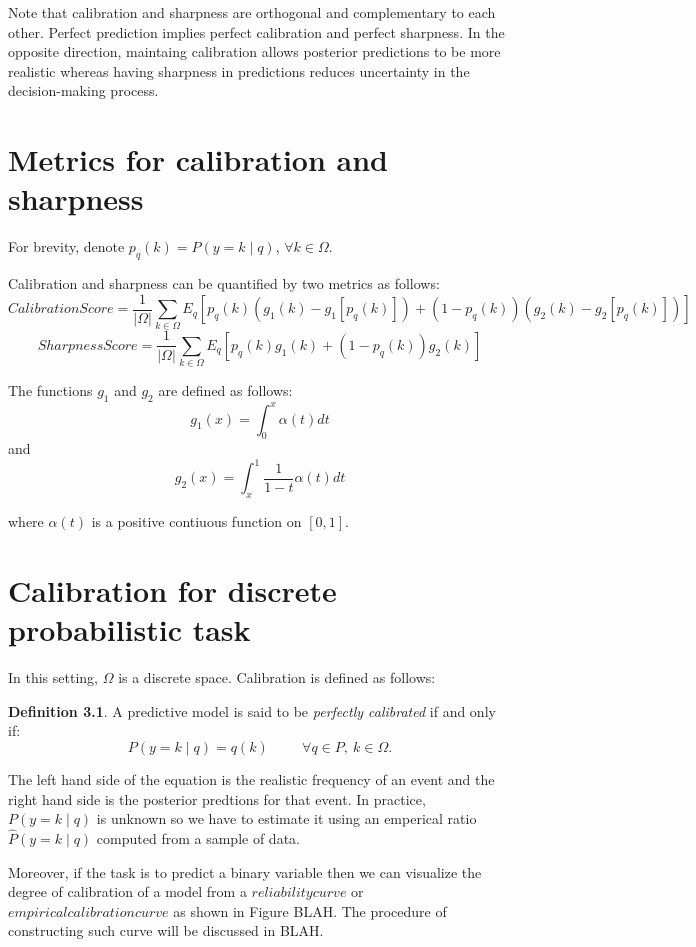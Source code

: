 Note that calibration and sharpness are orthogonal and complementary to each other. Perfect prediction implies perfect calibration and perfect sharpness. In the opposite direction, maintaing calibration allows posterior predictions to be more realistic whereas having sharpness in predictions reduces uncertainty in the decision-making process.   

\section{Metrics for calibration and sharpness}

For brevity, denote $p_q(k) = P(y = k \mid q)$, $\forall k \in \Omega$.

Calibration and sharpness can be quantified by two metrics as follows:
$$CalibrationScore = \frac{1}{|\Omega|}\sum_{k \in \Omega}{E_{q}[p_q(k)(g_1(k) - g_1[p_q(k)]) + (1 - p_q(k))(g_2(k) - g_2[p_q(k)])]}$$
$$SharpnessScore = \frac{1}{|\Omega|}\sum_{k \in \Omega}{E_{q}[p_q(k)g_1(k) + (1 - p_q(k))g_2(k)]}$$

The functions $g_1$ and $g_2$ are defined as follows:
$$g_1(x) = \int_{0}^{x}{\alpha(t)dt}$$
and
$$g_2(x) = \int_{x}^{1}{\frac{1}{1 - t}\alpha(t)dt}$$

where $\alpha(t)$ is a positive contiuous function on $[0, 1]$.

\section{Calibration for discrete probabilistic task}

In this setting, $\Omega$ is a discrete space. Calibration is defined as follows:

\textbf{Definition 3.1}. A predictive model is said to be \textit{perfectly calibrated} if and only if:
$$P(y = k \mid q) = q(k) \hspace{1cm} \forall q \in P,\ k \in \Omega.$$  

The left hand side of the equation is the realistic frequency of an event and the right hand side is the posterior predtions for that event. In practice, $P(y = k \mid q)$ is unknown so we have to estimate it using an emperical ratio $\hat{P}(y = k \mid q)$ computed from a sample of data. 

Moreover, if the task is to predict a binary variable then we can visualize the degree of calibration of a model from a $reliability curve$ or $empirical calibration curve$ as shown in Figure BLAH. The procedure of constructing such curve will be discussed in BLAH. 

